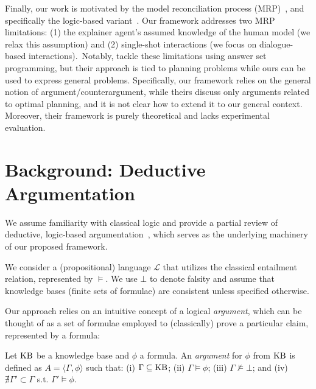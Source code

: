 \documentclass{article}
\begin{document}
Finally, our work is motivated by the model reconciliation process (MRP)~\citep{chakraborti2017plan,sreedharan2021using,sreedharan2022explainable}, and specifically the logic-based variant~\citep{son2021model,vas21,vasileioulogic,vasileioua2023please}. Our framework addresses two MRP limitations: (1) the explainer agent's assumed knowledge of the human model (we relax this assumption) and (2) single-shot interactions (we focus on dialogue-based interactions).~Notably, \citet{DungS22a} tackle these limitations using answer set programming, but their approach is tied to planning problems while ours can be used to express general problems. Specifically, our framework relies on the general notion of argument/counterargument, while theirs discuss only arguments related to optimal planning, and it is not clear how to extend it to our general context. Moreover, their framework is purely theoretical and lacks experimental evaluation.








\section{Background: Deductive Argumentation}
\label{sec:background}





We assume familiarity with classical logic and provide a partial review of deductive, logic-based argumentation~\citep{besnard2014constructing}, which serves as the underlying machinery of our proposed framework.

We consider a (propositional) language $\mathcal{L}$ that utilizes the classical entailment relation, represented by $\models$. We use $\bot$ to denote falsity and assume that knowledge bases (finite sets of formulae) are consistent unless specified otherwise.

Our approach relies on an intuitive concept of a logical \emph{argument}, which can be thought of as a set of formulae employed to (classically) prove a particular claim, represented by a formula:

\begin{definition}[Argument]
    Let $\mathrm{KB}$ be a knowledge base and $\phi$ a formula. An \emph{argument} for $\phi$ from $\mathrm{KB}$ is defined as $A = \langle \Gamma, \phi \rangle$ such that: (i) $\Gamma \subseteq \mathrm{KB}$; (ii) $\Gamma \models \phi$; (iii) $\Gamma \not \models \bot$; and (iv) $\nexists \Gamma' \subset \Gamma$ s.t. $\Gamma' \models \phi$.
    \label{def:arg}
\end{definition}
\end{document}
